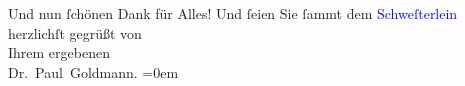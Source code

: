 \pstart
           Und nun ſchönen Dank für Alles! Und ſeien Sie ſammt dem \textcolor{blue}{Schweſterlein}{}\ledrightnote{{$\rightarrow$}\textcolor{blue}{Elisabeth Steinrück}} herzlichſt gegrüßt von
               {\\[\baselineskip]}Ihrem ergebenen {\\[\baselineskip]}\spacefill\mbox{Dr. Paul Goldmann.}\pend
           \leftskip=0em{}\endnumbering{}  
      